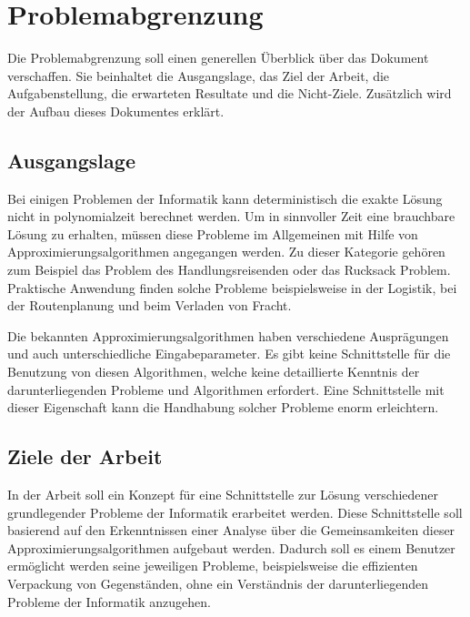 %
%

\chapter{Problemabgrenzung}\label{chap.projektuebersicht}
Die Problemabgrenzung soll einen generellen Überblick über das Dokument verschaffen. Sie beinhaltet die Ausgangslage, das Ziel der Arbeit, die Aufgabenstellung, die erwarteten 
Resultate und die Nicht-Ziele. Zusätzlich wird der Aufbau dieses Dokumentes erklärt.

\section{Ausgangslage}\label{ausganglage}
Bei einigen Problemen der Informatik kann deterministisch die exakte Lösung nicht in \gls{polynomialzeit} berechnet werden. Um in sinnvoller Zeit eine brauchbare Lösung zu erhalten, müssen diese 
Probleme im Allgemeinen mit Hilfe von Approximierungsalgorithmen angegangen werden. Zu dieser Kategorie gehören zum Beispiel das Problem des Handlungsreisenden oder das Rucksack 
Problem. Praktische Anwendung finden solche Probleme beispielsweise in der Logistik, bei der Routenplanung und beim Verladen von Fracht.

Die bekannten Approximierungsalgorithmen haben verschiedene Ausprägungen und auch unterschiedliche Eingabeparameter. Es gibt keine Schnittstelle für die Benutzung von diesen 
Algorithmen, welche keine detaillierte Kenntnis der darunterliegenden Probleme und Algorithmen erfordert. Eine Schnittstelle mit dieser Eigenschaft kann die Handhabung solcher Probleme 
enorm erleichtern.

\section{Ziele der Arbeit}\label{ziele}
In der Arbeit soll ein Konzept für eine Schnittstelle zur Lösung verschiedener grundlegender Probleme der Informatik erarbeitet werden. Diese Schnittstelle soll basierend auf den Erkenntnissen 
einer Analyse über die Gemeinsamkeiten dieser Approximierungsalgorithmen aufgebaut werden. Dadurch soll es einem Benutzer ermöglicht werden seine jeweiligen Probleme, beispielsweise die 
effizienten Verpackung von Gegenständen, ohne ein Verständnis der darunterliegenden Probleme der Informatik anzugehen.

